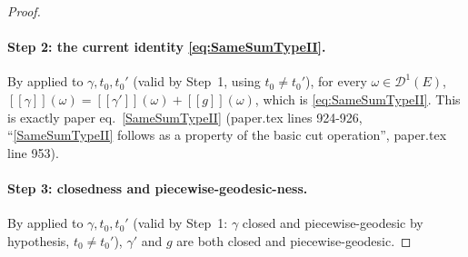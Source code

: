 \begin{proof}
  \paragraph{Step 2: the current identity \eqref{eq:SameSumTypeII}.} By 
  applied to $\gamma,t_0,t_0'$ (valid by Step~1, using $t_0\ne t_0'$), for every $\omega \in
  \mathcal{D}^1(E)$, $[[\gamma]](\omega) = [[\gamma']](\omega)+[[g]](\omega)$, which is
  \eqref{eq:SameSumTypeII}. This is exactly paper eq.~\eqref{SameSumTypeII} (paper.tex lines
  924-926, ``\eqref{SameSumTypeII} follows as a property of the basic cut operation'', paper.tex
  line 953).

  \paragraph{Step 3: closedness and piecewise-geodesic-ness.} By  applied to
  $\gamma,t_0,t_0'$ (valid by Step~1: $\gamma$ closed and piecewise-geodesic by hypothesis, $t_0\ne
  t_0'$), $\gamma'$ and $g$ are both closed and piecewise-geodesic.


\end{proof}
